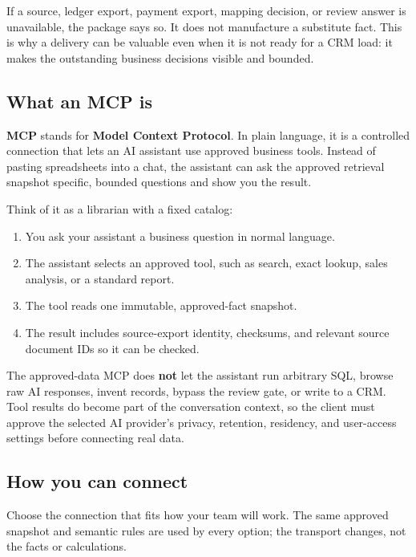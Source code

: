 \documentclass[
]{article}
\providecommand{\tightlist}{%
  \setlength{\itemsep}{0pt}\setlength{\parskip}{0pt}}
\begin{document}
If a source, ledger export, payment export, mapping decision, or review
answer is unavailable, the package says so. It does not manufacture a
substitute fact. This is why a delivery can be valuable even when it is
not ready for a CRM load: it makes the outstanding business decisions
visible and bounded.

\subsection{What an MCP is}\label{what-an-mcp-is}

\textbf{MCP} stands for \textbf{Model Context Protocol}. In plain
language, it is a controlled connection that lets an AI assistant use
approved business tools. Instead of pasting spreadsheets into a chat,
the assistant can ask the approved retrieval snapshot specific, bounded
questions and show you the result.

Think of it as a librarian with a fixed catalog:

\begin{enumerate}
\def\labelenumi{\arabic{enumi}.}
\tightlist
\item
  You ask your assistant a business question in normal language.
\item
  The assistant selects an approved tool, such as search, exact lookup,
  sales analysis, or a standard report.
\item
  The tool reads one immutable, approved-fact snapshot.
\item
  The result includes source-export identity, checksums, and relevant
  source document IDs so it can be checked.
\end{enumerate}

The approved-data MCP does \textbf{not} let the assistant run arbitrary
SQL, browse raw AI responses, invent records, bypass the review gate, or
write to a CRM. Tool results do become part of the conversation context,
so the client must approve the selected AI provider's privacy,
retention, residency, and user-access settings before connecting real
data.

\subsection{How you can connect}\label{how-you-can-connect}

Choose the connection that fits how your team will work. The same
approved snapshot and semantic rules are used by every option; the
transport changes, not the facts or calculations.
\end{document}
